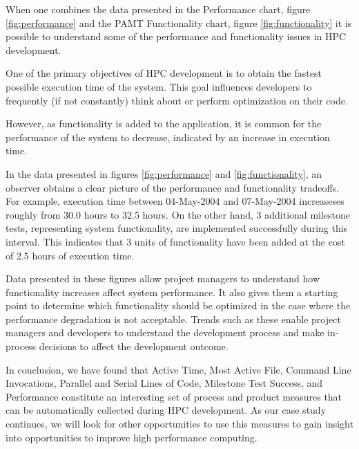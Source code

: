 \documentclass[times,10pt,twocolumn]{article}
\begin{document}
\label{sec:appperfvsfunctionality}

When one combines the data presented in the Performance chart, figure
\ref{fig:performance} and the PAMT Functionality chart, figure
\ref{fig:functionality} it is possible to understand some of the
performance and functionality issues in HPC development.

One of the primary objectives of HPC development is to obtain the
fastest possible execution time of the system.  This goal influences
developers to frequently (if not constantly) think about or perform
optimization on their code.

However, as functionality is added to the application, it is common
for the performance of the system to decrease, indicated by an
increase in execution time.

In the data presented in figures \ref{fig:performance} and
\ref{fig:functionality}, an observer obtains a clear picture of the
performance and functionality tradeoffs.  For example, execution time
between 04-May-2004 and 07-May-2004 increaseses roughly from 30.0
hours to 32.5 hours.  On the other hand, 3 additional milestone tests,
representing system functionality, are implemented successfully during
this interval.  This indicates that 3 units of functionality have been
added at the cost of 2.5 hours of execution time.

Data presented in these figures allow project managers to understand
how functionality increases affect system performance.  It also gives
them a starting point to determine which functionality should be
optimized in the case where the performance degradation is not
acceptable.  Trends such as these enable project managers and
developers to understand the development process and make in-process
decisions to affect the development outcome.

In conclusion, we have found that Active Time, Most Active File, Command
Line Invocations, Parallel and Serial Lines of Code, Milestone Test
Success, and Performance constitute an interesting set of process and
product measures that can be automatically collected during HPC
development.  As our case study continues, we will look for other
opportunities to use this measures to gain insight into opportunities to
improve high performance computing.



\end{document}
